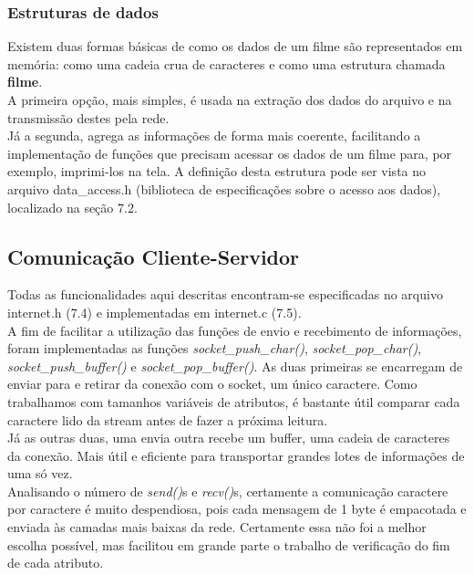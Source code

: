 \documentclass[11pt,twoside]{article}
\begin{document}
\subsubsection{Estruturas de dados}
Existem duas formas básicas de como os dados de um filme são representados em memória: como uma cadeia crua de caracteres e como uma estrutura chamada \textbf{filme}.\\
A primeira opção, mais simples, é usada na extração dos dados do arquivo e na transmissão destes pela rede.\\
Já a segunda, agrega as informações de forma mais coerente, facilitando a implementação de funções que precisam acessar os dados de um filme para, por exemplo, imprimi-los na tela. A definição desta estrutura pode ser vista no arquivo data\_access.h (biblioteca de especificações sobre o acesso aos dados), localizado na seção 7.2.\\

\subsection{Comunicação Cliente-Servidor}
Todas as funcionalidades aqui descritas encontram-se especificadas no arquivo internet.h (7.4) e implementadas em internet.c (7.5).\\
A fim de facilitar a utilização das funções de envio e recebimento de informações, foram implementadas as funções \textit{socket\_push\_char()}, \textit{socket\_pop\_char()}, \textit{socket\_push\_buffer()} e \textit{socket\_pop\_buffer()}. As duas primeiras se encarregam de enviar para e retirar da conexão com o socket, um único caractere. Como trabalhamos com tamanhos variáveis de atributos, é bastante útil comparar cada caractere lido da stream antes de fazer a próxima leitura.\\
Já as outras duas, uma envia outra recebe um buffer, uma cadeia de caracteres da conexão. Mais útil e eficiente para transportar grandes lotes de informações de uma só vez.\\
Analisando o número de \textit{send()}s e \textit{recv()}s, certamente a comunicação caractere por caractere é muito despendiosa, pois cada mensagem de 1 byte é empacotada e enviada às camadas mais baixas da rede. Certamente essa não foi a melhor escolha possível, mas facilitou em grande parte o trabalho de verificação do fim de cada atributo.
\end{document}
